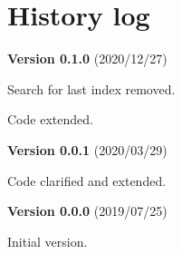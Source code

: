 \documentclass[12pt]{article}
\newenvironment{version}[2]{%
\textbf{Version #1} (#2)
\begin{bulItem}%
}{%
\end{bulItem}\bigskip%
}
\begin{document}
\newpage

\section{History log}

\begin{multicols}{2}

\begin{version}{0.1.0}{2020/12/27}
\item Search for last index removed.
\item Code extended.
\end{version}

\begin{version}{0.0.1}{2020/03/29}
\item Code clarified and extended.
\end{version}

\begin{version}{0.0.0}{2019/07/25}
\item Initial version.
\end{version}
\end{multicols}
\end{document}
